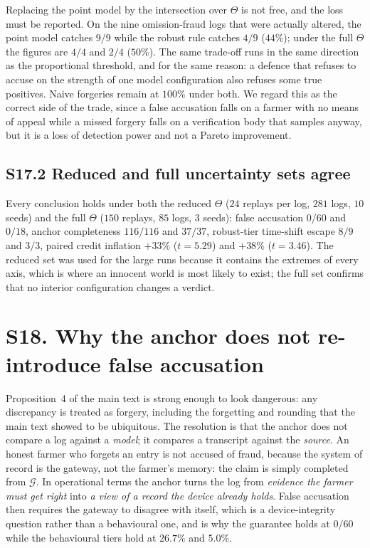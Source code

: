 Replacing the point model by the intersection over $\Theta$ is not free, and
the loss must be reported. On the nine omission-fraud logs that were actually
altered, the point model catches $9/9$ while the robust rule catches $4/9$
($44\%$); under the full $\Theta$ the figures are $4/4$ and $2/4$ ($50\%$).
The same trade-off runs in the same direction as the proportional threshold,
and for the same reason: a defence that refuses to accuse on the strength of
one model configuration also refuses some true positives. Naive forgeries
remain at $100\%$ under both. We regard this as the correct side of the trade,
since a false accusation falls on a farmer with no means of appeal while a
missed forgery falls on a verification body that samples anyway, but it is a
loss of detection power and not a Pareto improvement.

\subsection*{S17.2 Reduced and full uncertainty sets agree}

Every conclusion holds under both the reduced $\Theta$ ($24$ replays per log,
$281$ logs, $10$ seeds) and the full $\Theta$ ($150$ replays, $85$ logs,
$3$ seeds): false accusation $0/60$ and $0/18$, anchor completeness $116/116$
and $37/37$, robust-tier time-shift escape $8/9$ and $3/3$, paired credit
inflation $+33\%$ ($t=5.29$) and $+38\%$ ($t=3.46$). The reduced set was used
for the large runs because it contains the extremes of every axis, which is
where an innocent world is most likely to exist; the full set confirms that no
interior configuration changes a verdict.

\section*{S18. Why the anchor does not re-introduce false accusation}

Proposition~4 of the main text is strong enough to look dangerous: any
discrepancy is treated as forgery, including the forgetting and rounding that
the main text showed to be ubiquitous. The resolution is that the anchor does
not compare a log against a \emph{model}; it compares a transcript against the
\emph{source}. An honest farmer who forgets an entry is not accused of fraud,
because the system of record is the gateway, not the farmer's memory: the claim
is simply completed from $\mathcal{G}$. In operational terms the anchor turns
the log from \emph{evidence the farmer must get right} into \emph{a view of a
record the device already holds}. False accusation then requires the gateway to
disagree with itself, which is a device-integrity question rather than a
behavioural one, and is why the guarantee holds at $0/60$ while the behavioural
tiers hold at $26.7\%$ and $5.0\%$.

